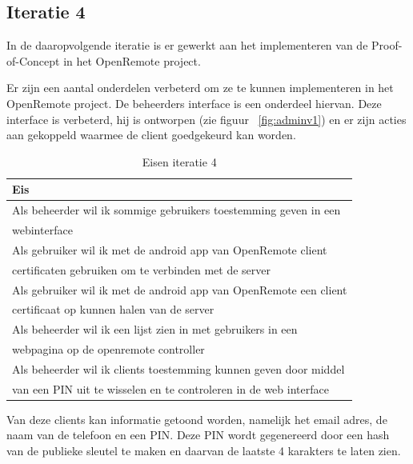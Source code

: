 \documentclass[]{article}
\begin{document}
\subsection{Iteratie 4}
In de daaropvolgende iteratie is er gewerkt aan het implementeren van de
Proof-of-Concept in het OpenRemote project.

Er zijn een aantal onderdelen verbeterd om ze te kunnen implementeren in het
OpenRemote project. De beheerders
interface is een onderdeel hiervan. Deze interface is verbeterd, hij is
ontworpen (zie figuur ~\ref{fig:adminv1}) en er zijn acties aan gekoppeld 
waarmee de client goedgekeurd kan worden.

\begin{table}[htpb]
  \caption{Eisen iteratie 4}
  \begin{center}
    \begin{tabular}{|| l ||}\hline
        Eis                                                              \\\hline\hline
        Als beheerder wil ik sommige gebruikers toestemming geven in een \\ 
        webinterface                                                     \\\hline
        Als gebruiker wil ik met de android app van OpenRemote client    \\ 
        certificaten gebruiken om te verbinden met de server             \\\hline
        Als gebruiker wil ik met de android app van OpenRemote een client\\
        certificaat op kunnen halen van de server                        \\\hline
        Als beheerder wil ik een lijst zien in met gebruikers in een     \\ 
        webpagina op de openremote controller                            \\\hline
        Als beheerder wil ik clients toestemming kunnen geven door middel\\ 
        van een PIN uit te wisselen en te controleren in de web interface\\\hline
    \end{tabular}
  \end{center}
\end{table}

Van deze clients kan informatie getoond worden, namelijk het email adres,
de naam van de telefoon en een PIN. Deze PIN wordt gegenereerd door een
hash van de publieke sleutel te maken en daarvan de laatste 4 karakters te
laten zien.
\end{document}
